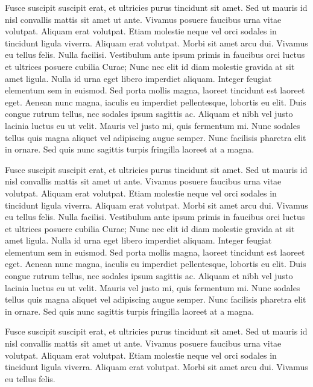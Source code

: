 \documentclass[twocolumn,a4paper,10pt]{article}
\begin{document}
Fusce suscipit suscipit erat, et ultricies purus tincidunt sit amet. Sed ut mauris id nisl convallis mattis sit amet ut ante. Vivamus posuere faucibus urna vitae volutpat. Aliquam erat volutpat. Etiam molestie neque vel orci sodales in tincidunt ligula viverra. Aliquam erat volutpat. Morbi sit amet arcu dui. Vivamus eu tellus felis.
Nulla facilisi. Vestibulum ante ipsum primis in faucibus orci luctus et ultrices posuere cubilia Curae; Nunc nec elit id diam molestie gravida at sit amet ligula. Nulla id urna eget libero imperdiet aliquam. Integer feugiat elementum sem in euismod. Sed porta mollis magna, laoreet tincidunt est laoreet eget. Aenean nunc magna, iaculis eu imperdiet pellentesque, lobortis eu elit. Duis congue rutrum tellus, nec sodales ipsum sagittis ac. Aliquam et nibh vel justo lacinia luctus eu ut velit. Mauris vel justo mi, quis fermentum mi. Nunc sodales tellus quis magna aliquet vel adipiscing augue semper. Nunc facilisis pharetra elit in ornare. Sed quis nunc sagittis turpis fringilla laoreet at a magna.

Fusce suscipit suscipit erat, et ultricies purus tincidunt sit amet. Sed ut mauris id nisl convallis mattis sit amet ut ante. Vivamus posuere faucibus urna vitae volutpat. Aliquam erat volutpat. Etiam molestie neque vel orci sodales in tincidunt ligula viverra. Aliquam erat volutpat. Morbi sit amet arcu dui. Vivamus eu tellus felis.
Nulla facilisi. Vestibulum ante ipsum primis in faucibus orci luctus et ultrices posuere cubilia Curae; Nunc nec elit id diam molestie gravida at sit amet ligula. Nulla id urna eget libero imperdiet aliquam. Integer feugiat elementum sem in euismod. Sed porta mollis magna, laoreet tincidunt est laoreet eget. Aenean nunc magna, iaculis eu imperdiet pellentesque, lobortis eu elit. Duis congue rutrum tellus, nec sodales ipsum sagittis ac. Aliquam et nibh vel justo lacinia luctus eu ut velit. Mauris vel justo mi, quis fermentum mi. Nunc sodales tellus quis magna aliquet vel adipiscing augue semper. Nunc facilisis pharetra elit in ornare. Sed quis nunc sagittis turpis fringilla laoreet at a magna.

Fusce suscipit suscipit erat, et ultricies purus tincidunt sit amet. Sed ut mauris id nisl convallis mattis sit amet ut ante. Vivamus posuere faucibus urna vitae volutpat. Aliquam erat volutpat. Etiam molestie neque vel orci sodales in tincidunt ligula viverra. Aliquam erat volutpat. Morbi sit amet arcu dui. Vivamus eu tellus felis.
\end{document}
